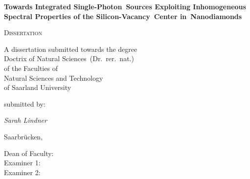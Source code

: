 




\begin{titlepage}
	\centering
	\null\vfill

	{\huge\bfseries Towards Integrated Single-Photon~Sources Exploiting Inhomogeneous Spectral Properties of the Silicon-Vacancy~Center in~Nanodiamonds\par}



	\vfill

	{\scshape\Large Dissertation}
	\vfill


	{\large A dissertation submitted towards the degree\\
	Doctrix of Natural Sciences~(Dr.~rer.~nat.)\\
	of the Faculties of\\
  Natural Sciences and Technology\\
	of Saarland University}


	\vfill
	submitted by:
	\vfill

	{\Large\itshape Sarah Lindner}

	\vfill

	{\large Saarbr\"ucken, \thesisdate{}}
	\vfill
\end{titlepage}



\newpage
\thispagestyle{plain}
\null
\vfill
\begin{description}
 	\item[Dean of Faculty:] %
	\item[Examiner 1:] %
	\item[Examiner 2:] %
\end{description}

\newpage



